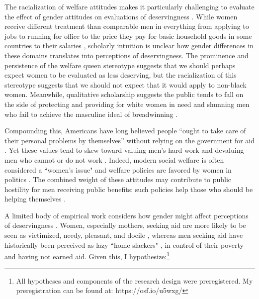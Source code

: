\documentclass[12pt]{article}%
\begin{document}
\begin{doublespace}
The racialization of welfare attitudes makes it particularly challenging to evaluate the effect of gender attitudes on evaluations of deservingness \citep{winter_beyond_2006}. While women receive different treatment than comparable men in everything from applying to jobs \citep{neumark_sex_1996, goldin_orchestrating_2000, quadlin_market} to running for office \citep{hassell_partys_2019, clayton_how_2020} to the price they pay for basic household goods in some countries \citep{betz_womens_2021} to their salaries \citep{castillo_gender_2013, mandel_up_2013}, scholarly intuition is unclear how gender differences in these domains translates into perceptions of deservingness. The prominence and persistence of the welfare queen stereotype suggests that we should perhaps expect women to be evaluated as less deserving, but the racialization of this stereotype suggests that we should not expect that it would apply to non-black women. Meanwhile, qualitative scholarship suggests the public tends to fall on the side of protecting and providing for white women in need and shunning men who fail to achieve the masculine ideal of breadwinning \cite{willrich2000home, glick_ambivalent_2001}.

Compounding this, Americans have long believed people ``ought to take care of their personal problems by themselves” without relying on the government for aid \citep{sniderman_coping_1977}. Yet these values tend to skew toward valuing men's hard work and devaluing men who cannot or do not work \citep{willrich2000home}. Indeed, modern social welfare is often considered a ``women's issue" and welfare policies are favored by women in politics \citep{krook2012all, greene2016diverse}. The combined weight of these attitudes may contribute to public hostility for men receiving public benefits: such policies help those who should be helping themselves \citep{bobocel_justice-based_1998, katz_racial_1988, sniderman_symbolic_1986, sniderman_beyond_1996, mclosky_ethos}.

A limited body of empirical work considers how gender might affect perceptions of deservingness \citep{monnat2010color, monnat2010toward}. Women, especially mothers, seeking aid are more likely to be seen as victimized, needy, pleasant, and docile \citep{glick_hostile_1997, glick_ambivalent_2001, schneider_social_1993}, whereas men seeking aid have historically been perceived as lazy ``home slackers" \citep{willrich2000home}, in control of their poverty and having not earned aid. Given this, I hypothesize:\footnote{All hypotheses and components of the research design were preregistered. My preregistration can be found at: https://osf.io/u5wxg/}


\end{doublespace}
\end{document}
